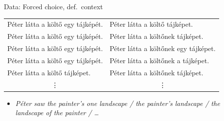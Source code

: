 \documentclass[12pt]{beamer}
\begin{document}
\begin{frame}{Data: Forced choice, def.\ context}


\begin{tabulary}{1\linewidth}{ll}
Péter látta a költő \textcolor{red!70!black}{egy} tájképét. & Péter látta a költő tájképet.\\
Péter látta a költő \textcolor{red!70!black}{egy} tájképét. & Péter látta a költőnek tájképet.\\
Péter látta a költő \textcolor{red!70!black}{egy} tájképét. & Péter látta a költőnek \textcolor{red!70!black}{egy} tájképet.\\
Péter látta a költő \textcolor{red!70!black}{egy} tájképét. & Péter látta a költőnek \alert{a} tájképet.\\
Péter látta a költő tájképet.     & Péter látta a költőnek tájképet.\\
 & \\
\end{tabulary}

\begin{itemize}
    \item \emph{Péter saw the painter's \textcolor{red!70!black}{one} landscape / the painter's landscape / \alert{the} landscape of the painter / \dots}
\end{itemize}

\end{frame}
\end{document}
